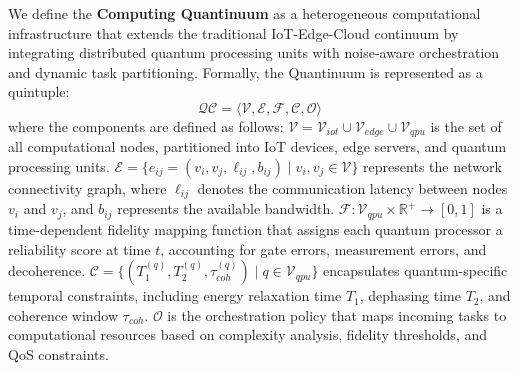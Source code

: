 \documentclass[lettersize,journal]{IEEEtran}
\begin{document}
We define the \textbf{Computing Quantinuum} as a heterogeneous computational infrastructure that extends the traditional IoT-Edge-Cloud continuum by integrating distributed quantum processing units with noise-aware orchestration and dynamic task partitioning. Formally, the Quantinuum is represented as a quintuple:
\begin{equation}
\mathcal{QC} = \langle \mathcal{V}, \mathcal{E}, \mathcal{F}, \mathcal{C}, \mathcal{O} \rangle
\label{eq:quantinuum_tuple}
\end{equation}
where the components are defined as follows:
    $\mathcal{V} = \mathcal{V}_{iot} \cup \mathcal{V}_{edge} \cup \mathcal{V}_{qpu}$ is the set of all computational nodes, partitioned into IoT devices, edge servers, and quantum processing units.
    $\mathcal{E} = \{e_{ij} = (v_i, v_j, \ell_{ij}, b_{ij}) \mid v_i, v_j \in \mathcal{V}\}$ represents the network connectivity graph, where $\ell_{ij}$ denotes the communication latency between nodes $v_i$ and $v_j$, and $b_{ij}$ represents the available bandwidth.
    $\mathcal{F}: \mathcal{V}_{qpu} \times \mathbb{R}^+ \rightarrow [0,1]$ is a time-dependent fidelity mapping function that assigns each quantum processor a reliability score at time $t$, accounting for gate errors, measurement errors, and decoherence.
    $\mathcal{C} = \{(T_1^{(q)}, T_2^{(q)}, \tau_{coh}^{(q)}) \mid q \in \mathcal{V}_{qpu}\}$ encapsulates quantum-specific temporal constraints, including energy relaxation time $T_1$, dephasing time $T_2$, and coherence window $\tau_{coh}$.
    $\mathcal{O}$ is the orchestration policy that maps incoming tasks to computational resources based on complexity analysis, fidelity thresholds, and QoS constraints.
\end{document}
